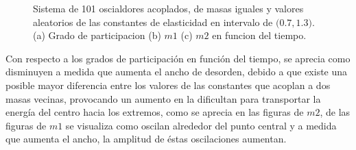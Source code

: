 \documentclass[11pt,letterpaper,twocolumn]{article}
\begin{document}
\begin{figure}[h!]
\begin{center}
\caption{Sistema de 101 oscialdores acoplados, de masas iguales y valores aleatorios de las constantes de elasticidad en intervalo de $(0$.$7,1$.$3)$. (a) Grado de participacion (b) $m1$ (c) $m2$ en funcion del tiempo.}
\end{center}
\end{figure}
\par 
Con respecto a los grados de participación en función del tiempo, se aprecia como disminuyen a medida que aumenta el ancho de desorden, debido a que existe una posible mayor diferencia entre los valores de las constantes que acoplan a dos masas vecinas, provocando un aumento en la dificultan para transportar la energía del centro hacia los extremos, como se aprecia en las figuras de $m2$, de las figuras de $m1$ se visualiza como oscilan alrededor del punto central y a medida que aumenta el ancho, la amplitud de éstas oscilaciones aumentan. 
\end{document}
